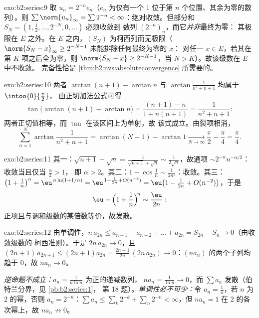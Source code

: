 \begin{solution}{exo:b2:series:9}
取 $u_n = 2^{-n} e_n$（$e_n$ 为仅有一个
$1$ 位于第 $n$ 个位置、其余为零的数列）。则 $\sum \norm{u_n}_\infty = \sum 2^{-n} <
\infty$：绝对收敛。但部分和 $S_N =
(1, \tfrac12, \dots, 2^{-N}, 0, \dots)$ 必须收敛到
数列 $(2^{-n})_n$，而它\emph{并非}最终为零：
其极限在 $E$ 之外。在 $E$ 之内，$(S_N)$ 为柯西列而无极限（$\norm{S_N
- x}_\infty \geq 2^{-N-1}$ 未能排除任何最终为零的 $x$：
对任一 $x \in E$，若其在第 $K$ 项之后全为零，则 $\norm{S_N - x} \geq
2^{-K-1}$，当 $N > K$）。故该级数在 $E$ 中不收敛。
完备性恰是 \cref{thm:b2:nvs:absoluteconvergence}
所需要的。
\end{solution}

\begin{solution}{exo:b2:series:10}
两者 $\arctan(n+1) - \arctan n$ 与
$\arctan\frac{1}{n^2+n+1}$ 均属于 $\intoo{0}{\frac\pi2}$，
由正切加法公式可得
\[
\tan\bigl(\arctan(n{+}1) - \arctan n\bigr)
= \frac{(n+1) - n}{1 + n(n+1)} = \frac{1}{n^2 + n + 1} :
\]
两者正切值相等，而 $\tan$ 在该区间上为单射，故
该式成立。由裂项相消，
\[
\sum_{n=1}^{N}\arctan\frac{1}{n^2+n+1}
= \arctan(N{+}1) - \arctan 1 \xrightarrow[N\to\infty]{}
\frac\pi2 - \frac\pi4 = \frac\pi4 .
\]

\end{solution}

\begin{solution}{exo:b2:series:11}
其一：$\sqrt{n+1} - \sqrt n = \frac{1}{\sqrt{n+1} + \sqrt n}
\sim \frac{1}{2\sqrt n}$，故通项 $\sim
2^{-\alpha}n^{-\alpha/2}$：收敛当且仅当 $\frac\alpha2 > 1$，
即 $\alpha > 2$。其二：$1 - \cos\frac1n \sim
\frac{1}{2n^2}$：收敛。其三：$\bigl(1 + \frac1n\bigr)^n =
\eu^{\,n\ln(1 + 1/n)} = \eu^{\,1 - \frac1{2n} + O(n^{-2})} =
\eu\bigl(1 - \frac{1}{2n} + O(n^{-2})\bigr)$，于是
\[
\eu - \Bigl(1 + \frac1n\Bigr)^{\!n} \sim \frac{\eu}{2n} :
\]
正项且与调和级数的某倍数等价，故发散。
\end{solution}

\begin{solution}{exo:b2:series:12}
由单调性，$n\,a_{2n} \leq a_{n+1} + a_{n+2} + \dots +
a_{2n} = S_{2n} - S_n \to 0$（由收敛级数的
柯西准则）。于是 $2n\,a_{2n} \to 0$，且 $(2n{+}1)\,
a_{2n+1} \leq (2n{+}1)a_{2n} = \frac{2n+1}{2n}\,(2n\,a_{2n}) \to
0$：$(na_n)$ 的两个子列均趋于 $0$，故 $na_n \to 0$。

\emph{逆命题不成立：}$a_n = \frac1{n\ln n}$ 为正的递减数列，
$na_n = \frac1{\ln n} \to 0$，而 $\sum a_n$
发散（伯特兰分界，见 \cref{pb:b2:series:1}，
第 18 题）。\emph{单调性必不可少：}令 $a_n = \frac1n$，若 $n$
为 $2$ 的幂，否则 $a_n = 2^{-n}$：$\sum a_n \leq
\sum_k 2^{-k} + \sum_n 2^{-n} < \infty$，但 $na_n = 1$
在 $2$ 的各次幂上，故 $na_n \not\to 0$。
\end{solution}

